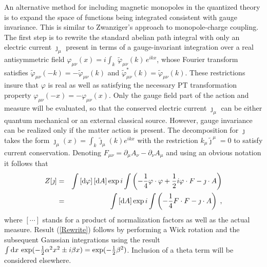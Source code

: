 \documentclass[a4paper,a4paper]{article}
\begin{document}
An alternative method for including magnetic monopoles in the quantized theory is to expand the space of functions being integrated consistent with gauge invariance.  This is similar to Zwanziger's approach \cite{Zwanziger} to monopole-charge coupling. The first step is to rewrite the standard abelian path integral with only an electric current $\jmath_\mu$ present in terms of a gauge-invariant integration over a real antisymmetric field $\varphi_{\mu \nu} (x) = i \int_k \, \tilde{\varphi}_{\mu \nu} (k) \, e^{ikx}$, whose Fourier transform satisfies $ \tilde{\varphi}_{\mu \nu} ( - k ) = - \tilde{\varphi}_{\mu \nu} ( k )$ and $\tilde{\varphi}^*_{\mu \nu} (k) = \tilde{\varphi}_{\mu \nu} (k) $. These restrictions insure that $\varphi$ is real as well as satisfying the necessary PT transformation property $\varphi_{\mu \nu} ( - x ) = - \varphi_{\mu \nu} ( x )$.  Only the gauge field part of the action and measure will be evaluated, so that the conserved electric current $\jmath_\mu$ can be either quantum mechanical or an external classical source. However, gauge invariance can be realized only if the matter action is present. The decomposition for $\jmath$ takes the form $\jmath_\mu (x) = \int_k \tilde{\jmath}_\mu (k) e^{ikx}$ with the restriction $k_\mu \tilde{\jmath}^{\, \mu} = 0$ to satisfy current conservation.  Denoting $F_{\mu \nu} = \partial_\mu A_\nu - \partial_\nu A_\mu$ and using an obvious notation it follows that 
\begin{eqnarray}
\label{Rewrite}
Z[\jmath] & = & \int \left[ {\rm d} \varphi \right] \left[ {\rm d} A \right] \exp i \int \left(  - \frac{1}{4} \varphi \cdot \varphi + \frac{1}{2} i \varphi \cdot F - \jmath \cdot A  \right)  
\nonumber
\\ & = &  \int \left[ {\rm d} A \right] \exp i \int \left( - \frac{1}{4} F \cdot F  - \jmath \cdot A \right) \; ,
\end{eqnarray} 
where $\left[ \cdots \right]$ stands for a product of normalization factors as well as the actual measure.  Result (\ref{Rewrite}) follows by performing a Wick rotation \cite{WickRotation} and the subsequent Gaussian integrations using the result $\int {\rm d}x \, \exp ( - {\small \frac{1}{2}} \alpha^2 x^2 \pm i \beta x ) = \exp (-  {\small \frac{1}{2}} \beta^2)$.   Inclusion of a theta term will be considered elsewhere.
\end{document}
